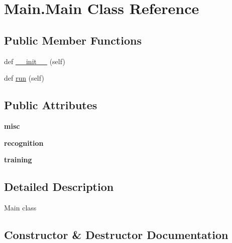 \hypertarget{class_main_1_1_main}{}\section{Main.\+Main Class Reference}
\label{class_main_1_1_main}
\subsection*{Public Member Functions}
\begin{DoxyCompactItemize}
\item 
def \mbox{\hyperlink{class_main_1_1_main_a25ab3329d16c1a94a9c9f8a2f5de404a}{\+\_\+\+\_\+init\+\_\+\+\_\+}} (self)
\item 
def \mbox{\hyperlink{class_main_1_1_main_ab9b18db6a7f0e5b336228e11d969bb76}{run}} (self)
\end{DoxyCompactItemize}
\subsection*{Public Attributes}
\begin{DoxyCompactItemize}
\item 
\mbox{\label{class_main_1_1_main_ac73e82b384a9f932e60a1bd9de6928a1}} 
{\bfseries misc}
\item 
\mbox{\label{class_main_1_1_main_a93fcc3e6603473e944ae88f341748a12}} 
{\bfseries recognition}
\item 
\mbox{\label{class_main_1_1_main_a241272bd154ba2437b5f67eef06536f8}} 
{\bfseries training}
\end{DoxyCompactItemize}


\subsection{Detailed Description}
\begin{DoxyVerb}Main class
\end{DoxyVerb}
 

\subsection{Constructor \& Destructor Documentation}
\mbox{\label{class_main_1_1_main_a25ab3329d16c1a94a9c9f8a2f5de404a}} 
